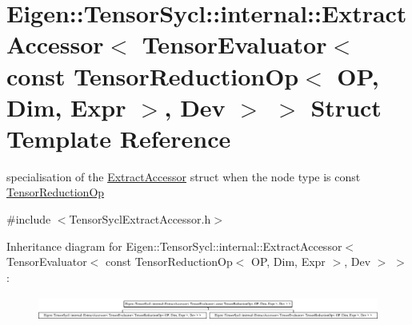 \hypertarget{struct_eigen_1_1_tensor_sycl_1_1internal_1_1_extract_accessor_3_01_tensor_evaluator_3_01const_017b84cc42bd938fc0857672c2d814fbbd}{}\section{Eigen\+:\+:Tensor\+Sycl\+:\+:internal\+:\+:Extract\+Accessor$<$ Tensor\+Evaluator$<$ const Tensor\+Reduction\+Op$<$ OP, Dim, Expr $>$, Dev $>$ $>$ Struct Template Reference}
\label{struct_eigen_1_1_tensor_sycl_1_1internal_1_1_extract_accessor_3_01_tensor_evaluator_3_01const_017b84cc42bd938fc0857672c2d814fbbd}


specialisation of the \hyperlink{struct_eigen_1_1_tensor_sycl_1_1internal_1_1_extract_accessor}{Extract\+Accessor} struct when the node type is const \hyperlink{class_eigen_1_1_tensor_reduction_op}{Tensor\+Reduction\+Op}  




{\ttfamily \#include $<$Tensor\+Sycl\+Extract\+Accessor.\+h$>$}

Inheritance diagram for Eigen\+:\+:Tensor\+Sycl\+:\+:internal\+:\+:Extract\+Accessor$<$ Tensor\+Evaluator$<$ const Tensor\+Reduction\+Op$<$ OP, Dim, Expr $>$, Dev $>$ $>$\+:\begin{figure}[H]
\begin{center}
\leavevmode
\includegraphics[height=0.804598cm]{struct_eigen_1_1_tensor_sycl_1_1internal_1_1_extract_accessor_3_01_tensor_evaluator_3_01const_017b84cc42bd938fc0857672c2d814fbbd}
\end{center}
\end{figure}
